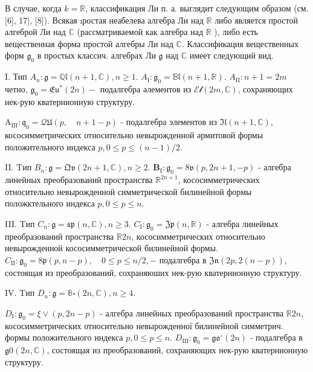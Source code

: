 \documentclass[10pt]{article}
\begin{document}
В случае, когда $k=\mathbb{R}$, классификация Ли п. а. выглядит следующим образом (см. [6], 17], [8]). Всякая ıростая неабелева алгебра Ли над $\mathbb{R}$ либо является простой алгеброй Ли над $\mathbb{C}$ (рассматриваемой как алгебра над $\mathbb{R}$ ), либо есть вещественная форма простой алгебры Ли над $\mathbb{C}$. Классификация вещественных форм $\mathfrak{g}_{0}$ в простых классич. алгебрах Ли $\mathfrak{g}$ над $\mathbb{C}$ имеет следующий вид.



I. Тип $A_{n}: \mathfrak{g}=\mathbb{Q l}(n+1, \mathbb{C}), n \geqslant 1$. $A_{\mathrm{I}}: \mathfrak{g}_{0}=\mathbb{B l}(n+1, \mathbb{R})$. $A_{\mathrm{II}}: n+1=2 m$ четно, $\mathfrak{g}_{0}=\mathfrak{E} \mathfrak{u}^{*}(2 n)-$ подалгебра әлементов из $\mathscr{E l}(2 m, \mathbb{C})$, сохраняющих нек-рую кватернионную структуру.



$\mathrm{A}_{\mathrm{III}}: \mathfrak{q}_{0}=\mathcal{Q} \mathfrak{U}(p, \quad n+1-p)$ - подалгебра элементов из $\mathfrak{I l}(n+1, \mathbb{C})$, кососимметрических относительно невырожденной әрмитовой формы положительного индекса $p, 0 \leqslant p \leqslant(n-1) / 2$.



II. Tип $B_{n}: \mathfrak{g}=\mathfrak{Q v}(2 n+1, \mathbb{C}), n \geqslant 2$. $\mathbf{B}_{\mathrm{I}}: \mathfrak{g}_{0}=\mathfrak{8 v}(p, 2 n+1,-p)$ - алгебра линейных преобразований пространства $\mathbb{R}^{2 n+1}$, кососимметрических относительно невырожденной симметрической билинейной формы положктельного индекса $p, 0 \leqslant p \leqslant n$.



III. Tип $C_{n}: \mathfrak{g}=\mathfrak{s} \mathfrak{p}(n, \mathbb{C}), n \geqslant 3$. $C_{\mathrm{I}}: \mathfrak{g}_{0}=\mathfrak{Z p}(n, \mathbb{R})$ - алгебра линейных преобразований пространства $\mathbb{R} 2 n$, кососимметрических относительно невырожденной кососимметрической билинейной формы. $C_{\mathrm{II}}: \mathfrak{g}_{0}=\mathfrak{8 p}(p, n-p), \quad 0 \leqslant p \leqslant n / 2,-$ подалгебра в $\mathfrak{Z} \mathfrak{n}(2 p, 2(n-p))$, состоящая из преобразований, сохраняюших нек-рую кватернионную структуру.



IV. Tип $D_{n}: \mathfrak{g}=\mathbb{8} \square(2 n, \mathbb{C}), n \geqslant 4$.



$D_{\mathrm{I}}: \mathfrak{g}_{0}=\mathfrak{\xi \vee}(p, 2 n-p)$ - алгебра линейных преобразований пространства $\mathbb{R} 2 n$, кососимметрических относительно невырожденної билинейной симметрич. формы положительного индекса $p, 0 \leqslant p \leqslant n$. $D_{\mathrm{III}}: \mathfrak{g}_{0}=\mathfrak{g o}^{\circ}(2 n)$ - подалгебра в $\mathfrak{g} \mathfrak{0}(2 n, \mathbb{C})$, состоящая из преобразований, сохраняющих нек-рую кватернионную структуру.
\end{document}
